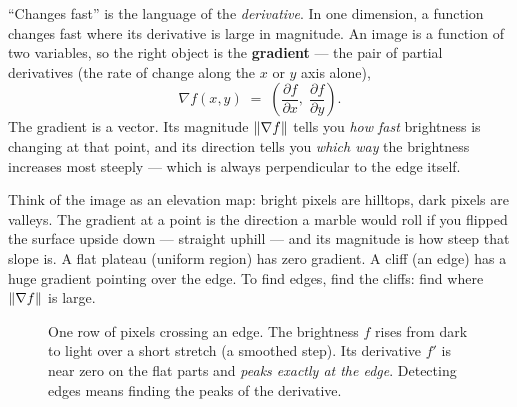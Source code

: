 ``Changes fast'' is the
language of the \emph{derivative}. In one dimension, a function changes fast
where its derivative is large in magnitude. An image is a function of two
variables, so the right object is the \textbf{gradient} --- the pair of partial
derivatives (the rate of change along the $x$ or $y$ axis alone),
\begin{equation}
\label{ch32:gradient-cont}
\nabla f(x,y) \;=\; \left( \frac{\partial f}{\partial x},\; \frac{\partial f}{\partial y} \right).
\end{equation}
The gradient is a vector. Its magnitude $\lVert\nabla f\rVert$ tells you \emph{how
fast} brightness is changing at that point, and its direction tells you
\emph{which way} the brightness increases most steeply --- which is always
perpendicular to the edge itself.

\begin{intuitionbox}
Think of the image as an elevation map: bright pixels are hilltops, dark pixels are
valleys. The gradient at a point is the direction a marble would roll if you
flipped the surface upside down --- straight uphill --- and its magnitude is
how steep that slope is. A flat plateau (uniform region) has zero gradient. A
cliff (an edge) has a huge gradient pointing over the edge. To find edges, find
the cliffs: find where $\lVert\nabla f\rVert$ is large.
\end{intuitionbox}

\begin{figure}[H]
\centering
{}
\caption{One row of pixels crossing an edge. The brightness $f$ rises from dark
to light over a short stretch (a smoothed step). Its derivative $f'$ is near
zero on the flat parts and \emph{peaks exactly at the edge}. Detecting edges
means finding the peaks of the derivative.}
\label{ch32:fig-step-edge}
\end{figure}

